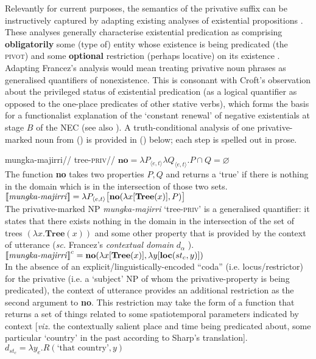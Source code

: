 \documentclass[usenames,dvipsnames,11pt]{article}
\newcommand{\denote}[1]{\mbox{$[\![\mbox{#1}]\!]$}}
\begin{document}
{Relevantly for current purposes, the semantics of the privative suffix can be instructively captured by adapting existing analyses of existential propositions \citep[e.g.][]{Francez2007,Francez2011}. These analyses generally characterise existential predication as comprising \textbf{obligatorily} some (type of) entity whose existence is being predicated (the \textsc{pivot)} and some \textbf{optional} restriction (perhaps locative) on its existence \citep[the \textsc{coda}; see][]{Francez2007}. Adapting Francez's analysis would mean treating privative noun phrases as generalised quantifiers of nonexistence. This is consonant with Croft's \citeyearpar[18]{Croft1991} observation about the privileged status of existential predication (as a logical quantifier as opposed to the one-place predicates of other stative verbs), which forms the basis for a functionalist explanation of the `constant renewal' of negative existentials at stage $B$ of the NEC (see also \citealt[173]{Veselinova2016}).
A truth-conditional analysis of one privative-marked noun from () is provided in (\nextx) below; each step is spelled out in prose.

\pex \a\begingl\gla mungka-majirri//
\glb tree-\textsc{priv}//
\endgl
\a $\textbf{no}=\lambda P_{\langle e,t\rangle}\lambda Q_{\langle e,t\rangle}.P\cap Q=\varnothing$\hfill{\citep[e.g.][169]{Barwise1981}}\\
The function \textbf{no} takes two properties $P,Q$ and returns a `true' if there is nothing in the domain which is in the intersection of those two sets.
\a\label{privsemsF} $\denote{\textit{mungka-majirri}}=\lambda P_{\langle e,t\rangle}\big[\textbf{no}(\lambda x[\textbf{Tree}(x)],P)\big]$\\
The privative-marked NP \textit{mungka-majirri} `tree\textsc{-priv}' is a generalised quantifier: it states that there exists nothing in the domain in the intersection of the set of trees $(\lambda x.\textbf{Tree}(x))$ and some other property that is provided by the context of utterance (\textit{sc.} Francez's \textit{contextual domain} $d_\alpha$ \citeyearpar[1838]{Francez2011}).
\a$\denote{\textit{mungka-majirri}}^c=\textbf{no}(\lambda x[\textbf{Tree}(x)],\lambda y[\textbf{loc}(st_c,y)])$\\
In the absence of an explicit/linguistically-encoded ``coda'' (i.e. locus/restrictor) for the privative (i.e. a `subject' NP of whom the privative-property is being predicated), the context of utterance provides an additional restriction as the second argument to \textbf{no}. This restriction may take the form of a function that returns a set of things related to some spatiotemporal parameters indicated by context [\textit{viz.} the contextually salient place and time being predicated about, some particular `country' in the past according to Sharp's translation]. $d_{st_c}=\lambda y_e.R(\text{`that country'},y)$
\xe


}
\end{document}
